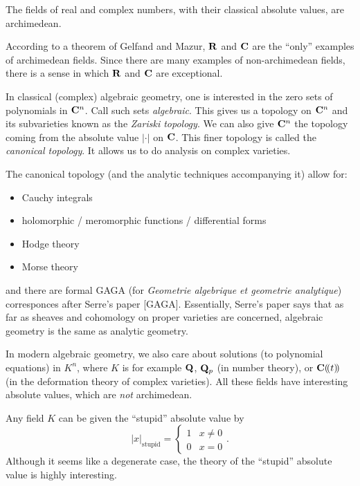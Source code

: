 \documentclass[oneside]{article}
\begin{document}
\begin{example}
The fields of real and complex numbers, with their classical absolute 
values, are archimedean.
\end{example}

According to a theorem of Gelfand and Mazur, $\mathbf{R}$ and $\mathbf{C}$ are the ``only'' 
examples of archimedean fields. Since there are many examples of 
non-archimedean fields, there is a sense in which $\mathbf{R}$ and $\mathbf{C}$ are 
exceptional. 

\begin{example}
In classical (complex) algebraic geometry, one is interested in the zero sets 
of polynomials in $\mathbf{C}^n$. Call such sets \emph{algebraic}. This gives us a 
topology on $\mathbf{C}^n$ and its subvarieties known as the \emph{Zariski topology}. 
We can also give $\mathbf{C}^n$ the topology coming from the absolute value $|\cdot|$ 
on $\mathbf{C}$. This finer topology is called the \emph{canonical topology}. It 
allows us to do analysis on complex varieties. 
\end{example}

The canonical topology (and the analytic techniques accompanying it) allow for: 
\begin{itemize}
  \item Cauchy integrals
  \item holomorphic / meromorphic functions / differential forms
  \item Hodge theory
  \item Morse theory
\end{itemize}
and there are formal GAGA (for \emph{Geometrie algebrique et geometrie 
analytique}) corresponces after Serre's paper [GAGA]. Essentially, Serre's 
paper says that as far as sheaves and cohomology on proper varieties are 
concerned, algebraic geometry is the same as analytic geometry. 

In modern algebraic geometry, we also care about solutions (to polynomial 
equations) in $K^n$, where $K$ is for example $\mathbf{Q}$, $\mathbf{Q}_p$ (in number 
theory), or $\mathbf{C}(\!( t)\!)$ (in the deformation theory of complex varieties). 
All these fields have interesting absolute values, which are \emph{not} 
archimedean.

\begin{example}
Any field $K$ can be given the ``stupid'' absolute value by 
\[
  |x|_\mathrm{stupid} = \begin{cases} 1 & x\ne 0 \\ 0 & x=0 \end{cases} .
\]
Although it seems like a degenerate case, the theory of the ``stupid'' 
absolute value is highly interesting. 
\end{example}
\end{document}
